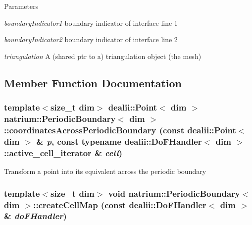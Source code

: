 \begin{DoxyParams}{Parameters}
\item[{\em boundaryIndicator1}]boundary indicator of interface line 1 \item[{\em boundaryIndicator2}]boundary indicator of interface line 2 \item[{\em triangulation}]A (shared ptr to a) triangulation object (the mesh) \end{DoxyParams}


\subsection{Member Function Documentation}
\hypertarget{classnatrium_1_1PeriodicBoundary_a9a5677bbc1d59499ceec15a7893b8688}{
\subsubsection[{coordinatesAcrossPeriodicBoundary}]{\setlength{\rightskip}{0pt plus 5cm}template$<$size\_\-t dim$>$ dealii::Point$<$ dim $>$ {\bf natrium::PeriodicBoundary}$<$ dim $>$::coordinatesAcrossPeriodicBoundary (const dealii::Point$<$ dim $>$ \& {\em p}, \/  const typename dealii::DoFHandler$<$ dim $>$::active\_\-cell\_\-iterator \& {\em cell})}}
\label{classnatrium_1_1PeriodicBoundary_a9a5677bbc1d59499ceec15a7893b8688}
Transform a point into its equivalent across the periodic boundary \hypertarget{classnatrium_1_1PeriodicBoundary_a233d460baa307b13bc32efb57c07f7c5}{
\subsubsection[{createCellMap}]{\setlength{\rightskip}{0pt plus 5cm}template$<$size\_\-t dim$>$ void {\bf natrium::PeriodicBoundary}$<$ dim $>$::createCellMap (const dealii::DoFHandler$<$ dim $>$ \& {\em doFHandler})}}
\label{classnatrium_1_1PeriodicBoundary_a233d460baa307b13bc32efb57c07f7c5}


